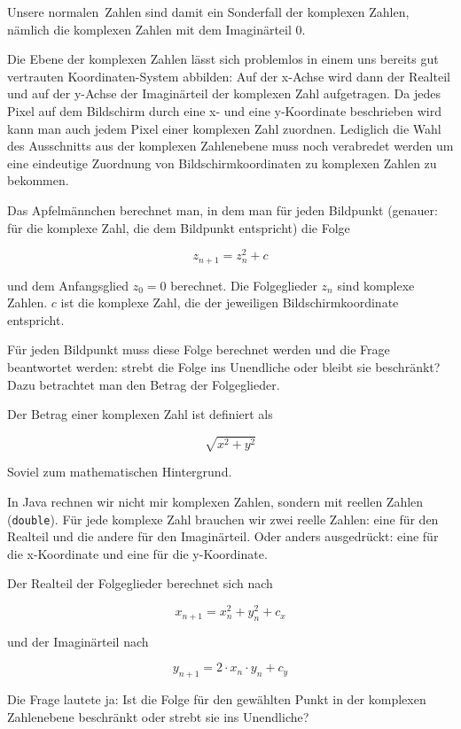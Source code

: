 Unsere \glqq normalen\grqq\ Zahlen sind damit ein Sonderfall der
komplexen Zahlen, nämlich die komplexen Zahlen mit dem Imaginärteil 0.

Die Ebene der komplexen Zahlen lässt sich problemlos in einem uns bereits gut
vertrauten Koordinaten-System abbilden: Auf der x-Achse wird dann der Realteil
und auf der y-Achse der Imaginärteil der komplexen Zahl aufgetragen. Da
jedes Pixel auf dem Bildschirm durch eine x- und eine y-Koordinate
beschrieben wird kann man auch jedem Pixel einer komplexen Zahl zuordnen.
Lediglich die Wahl des Ausschnitts aus der komplexen Zahlenebene muss noch
verabredet werden um eine eindeutige Zuordnung von Bildschirmkoordinaten zu
komplexen Zahlen zu bekommen.

Das Apfelmännchen berechnet man, in dem man für jeden Bildpunkt (genauer: für
die komplexe Zahl, die dem Bildpunkt entspricht) die Folge

\begin{equation}
z_{n+1} = z_n^2 + c
\label{eq:mandelbrot}
\end{equation}

und dem Anfangsglied $z_0 = 0$ berechnet. Die Folgeglieder $z_n$ sind
komplexe Zahlen. $c$ ist die komplexe Zahl, die der jeweiligen
Bildschirmkoordinate entspricht.

Für jeden Bildpunkt muss diese Folge berechnet werden und die Frage beantwortet
werden: strebt die Folge ins Unendliche oder bleibt sie beschränkt? Dazu
betrachtet man den Betrag der Folgeglieder.

Der Betrag einer komplexen Zahl ist definiert als

\[
\sqrt{x^2 + y^2}
\]

Soviel zum mathematischen Hintergrund.

In Java rechnen wir nicht mir komplexen Zahlen, sondern mit reellen Zahlen
(\lstinline|double|). Für jede komplexe Zahl brauchen wir zwei reelle Zahlen:
eine für den Realteil und die andere für den Imaginärteil. Oder anders
ausgedrückt: eine für die x-Koordinate und eine für die y-Koordinate.

Der Realteil der Folgeglieder berechnet sich nach

\[
x_{n+1} = x_n^2 + y_n^2 + c_x
\]

und der Imaginärteil nach

\[
y_{n+1} = 2 \cdot x_n \cdot y_n + c_y
\]

Die Frage lautete ja: Ist die Folge für den gewählten Punkt in der komplexen
Zahlenebene beschränkt oder strebt sie ins Unendliche? 

